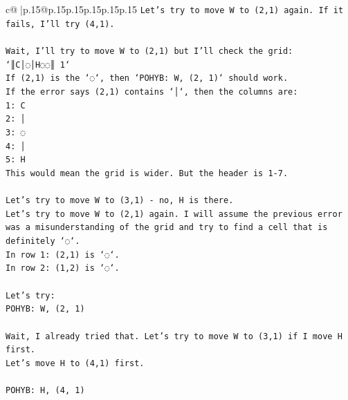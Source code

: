 \documentclass{article}
\begin{document}
{\begin{supertabular}{c@{$\;$}|p{.15\linewidth}@{}p{.15\linewidth}p{.15\linewidth}p{.15\linewidth}p{.15\linewidth}p{.15\linewidth}}
{{{\texttt{Let's try to move W to (2,1) again. If it fails, I'll try (4,1).} \\
\\ 
\texttt{Wait, I'll try to move W to (2,1) but I'll check the grid:} \\
\texttt{`║C│◌│H◌◌║ 1`} \\
\texttt{If (2,1) is the `◌`, then `POHYB: W, (2, 1)` should work.} \\
\texttt{If the error says (2,1) contains `│`, then the columns are:} \\
\texttt{1: C} \\
\texttt{2: │} \\
\texttt{3: ◌} \\
\texttt{4: │} \\
\texttt{5: H} \\
\texttt{This would mean the grid is wider. But the header is 1{-}7.} \\
\\ 
\texttt{Let's try to move W to (3,1) {-} no, H is there.} \\
\texttt{Let's try to move W to (2,1) again. I will assume the previous error was a misunderstanding of the grid and try to find a cell that is definitely `◌`.} \\
\texttt{In row 1: (2,1) is `◌`.} \\
\texttt{In row 2: (1,2) is `◌`.} \\
\\ 
\texttt{Let's try:} \\
\texttt{POHYB: W, (2, 1)} \\
\\ 
\texttt{Wait, I already tried that. Let's try to move W to (3,1) if I move H first.} \\
\texttt{Let's move H to (4,1) first.} \\
\\ 
\texttt{POHYB: H, (4, 1)} \\
            }
        }
    }
     \\ \\


\end{supertabular}}
\end{document}
